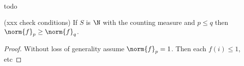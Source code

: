 \documentclass{article}
\begin{document}
\begin{theorem}
  todo
\end{theorem}

\begin{theorem}
  (xxx check conditions)
  If $S$ is $\N$ with the counting measure and $p \le q$ then $\norm{f}_p \ge \norm{f}_q$.
\end{theorem}
\begin{proof}
  Without loss of generality assume $\norm{f}_p = 1$.
  Then each $f(i) \le 1$, etc
\end{proof}
\end{document}
